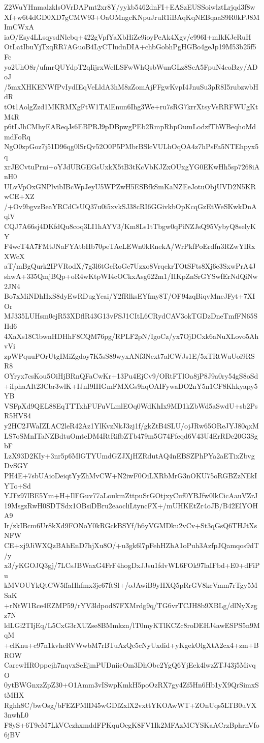 Z2WuYHnmalzklsOVrDAPmt2xr8Y/yykb5462dnFI+EASzEUSSoiwlztLrjqd3f8w
Xf+w6t4dGD0XD7gCMW93+OaOMngcKNpuJruR1iBAqKqNEBqaaS9R0kPJ8MImCWxA
iaO/Esy4LLsqysdNlebq+422gVpfYaXbHiZe9ioyPeAk4Xgv/e996I+mIkKJeRuH
OtLatIbuYjTxqRR7AGuoB4LyCTludnDIA+chbGobhPgHGBo4geJp19M53b25f5Fc
yo2UhO8r/ufmrQUYdpT2qIijrxWelLSFwWhQsbWunGLz8ScA5FpuN4coBzy/ADoJ
/5mxXHKENWfPvIydIEqVeLldA3hM8zZomAjFFgwKvpI4JnuSu3pR8I5rubzwbHdR
tOt1AolgZzd1MKRMXgFtW1TAlEnun6Ihg3We+ru7sRG7krrXtsyVsRRFWUgKtM4R
p6tLJhCMhyEAReqJs6EBPRJ9pDBpwgPEb2RmpRbpOumLodzfThWBeqhoMdmdFoRq
NgO0zpGoz7j51D96qg0lSrQv52O0P5PMbrBSlcVULhOqOA4z7hPsFa5NTEhpyx5q
xrJECvtuPrni+oYJdURGEGsUxkX5tB3tKcVbKJZxOUxgYG0EKwHh5sp7268iAnH0
ULvVpOxGNPlvibIBcWpJeyU5WPZwH5ESBfkSmKaNZEeJotuObjUVD2N5KRwCE+XZ
/+Ov9bgvzBeaYRCdCsUQ37u0i5xvkSJ38cRI6GGivkbOpKcqGzEtWeSKwkDnAqlV
CQJ7A66sj4DKfdQu8coq3LI1hAYV3/Km8Ls1tTbgw0qPiNZJsQ95VybyQ8selyKY
F4wcT4A7FMtJNaFYAtbHb70peTAeLEWn0kRnekA/WrPkfPoErdfn3RZwYlRxXWcX
aT/mBgQurk2IPVRodX/7g3l6tGcRoGc7Uzxo8VrqckrTOtSFts8Xj6e3SxwPrA4J
shwA+335QmjBQp+oR4wKtpWI4cOCkxAsg622m1/IIKpZnSrGYSwfErNdQiNw2JN4
Bo7xMiNDhHxS8dyEwRDugYcai/Y2fRlksEYfmy8T/OF94zqBiqvMncJFyt+7XIOr
MJ335LUHsm0ejR53XDflR43G13vFSJ1CItL6CRydCAV3okTGDzDneTmfFN65SHd6
4XaXs18ClbwnHDHhF8CQM76pg/RPLF2pN/IgoCz/yx7OjDCxk6aNuXLovo5AhvVi
zpWPquuPOrUtgIMiZgdoy7K5sS89wyxANf3Next7alCWJs1E/5xTRtWuUoi9RSR8
OYryx7csKou5OiHjBRnQFaCwKr+13Pu4EjCv9/ORtFTlOa8jP8J9a0ry54gS8oSd
+iIphaAIt23Cbr3wlK+IJnI9IHGmFMXGs9hqOAIFywaDO2nY5n1CF8Khkyapy5YB
VSFpXd9QEL88EqTTTxhFUFuVLmlEOq0WdKhIx9MD1kZbWd5aSwdU+sb2PsR5HVS4
y2HC2JWaIZLAC2leR42Az1YlKvzNkJ3zj1f/gkZtB4SLU/ojJRw65OReJYJ80qxM
LS7oSMnITaNZBdtuOmtcDM4RtRifbZTb479m5G74Ffeqd6V43U4ErRDe20G3SgbF
LzX93D2KIy+3nr5p6MlGTYUmdGZJXjHZRdutAQ4nEBSZPhPYa2aETixZbvgDvSGY
PH4E+7sbUAioDeiqtYyZhMvCW+N2iwF0OiLXRbMrG3nOKU75oRGBZzNEkIYTo+Sd
YJFz97lBE5Ym+H+IlFGuv77aLoukmZttpuSrGOtjxyCuf0YBJfw0lkCicAauVZrJ
19MsgzRwH0SDTSdx1OBsiDBru2eaocliLtyncFX+/mUHKEtZr4oJB/B42ElYOHA9
Ir/zkIBcm6Ur8kXd9FONoY0kRGckBSYf/b6yVGMDku2vCv+St3qGsQ6THJtXsNFW
CE+xj9JiWXQzBAhEnD7hjXu8O/+u3gk6l7pFehHZhA1oPuh3AzfpJQamqos9dT/y
x3/yKGOJQ3gj/7LCsJBWaxG4FrF4hogDxJJsu1fdvWL6FOk97laIFbd+E0+dFiPu
kMVOUYkQtCW5ffaHhfmx3jc67ftSl+/oJAwiB9yHXQ5pRrGV8kcVmm7rTgy5MSaK
+rNtW1Rce4EZMP59/rYV3ldpod87FXMrdg9q/TG6vrTCJH8b9XBLg/dlNyXzgz7N
ldLGi2TIjEq/L5CxG3rXUZse8BMmkzn/lT0myKTlKCZc8roDEHJ4awESPS5n9MqM
+clKnu+c97n1kvheRVWwbM7rBTuAzQc5cNyUxdid+yKgekOlgXtA2cx4+zm+BROW
CarewHROppcjh7nqvxSeEjmPUDniieOm3DhObc2YgQ6YjEek4lwzZTJ43j5MivqO
0ytBWGnxzZpZ30+O1Amm3vISwpKmkH5poOzRX7gy4Zf5Hn6Hb1yX9QrSimxStMHX
Rghh8C/bwOsg/bFEZPMlD45wGDlZxlX2vxttYKOAwWT+ZOnUqs5LTB0uVX3nwhL0
F8yS+6T9cM7LkVCezhxmddFPKquOcgK8FV1Ik2MFAzMCYSKaACrzBphrnVfo6jBV
